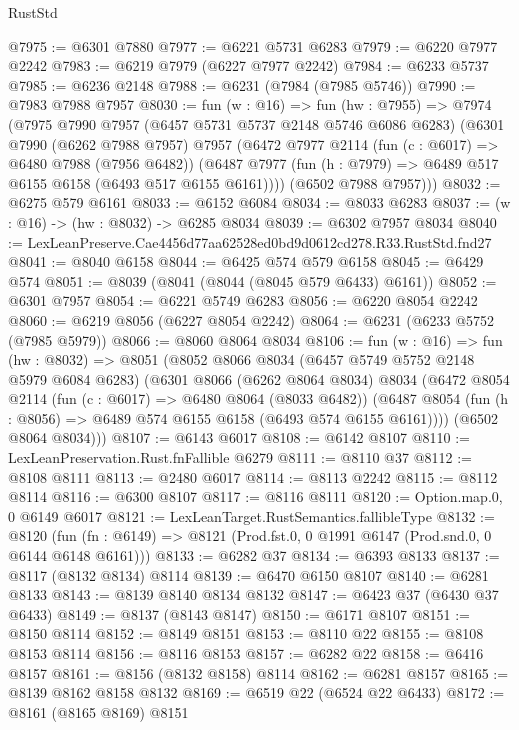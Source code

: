 \begin{lexlean}{RustStd}
\begin{coremodule}
@7975 := @6301 @7880
@7977 := @6221 @5731 @6283
@7979 := @6220 @7977 @2242
@7983 := @6219 @7979 (@6227 @7977 @2242)
@7984 := @6233 @5737
@7985 := @6236 @2148
@7988 := @6231 (@7984 (@7985 @5746))
@7990 := @7983 @7988 @7957
@8030 := fun (w : @16) =>
  fun (hw : @7955) =>
  @7974
    (@7975
      @7990
      @7957
      (@6457 @5731 @5737 @2148 @5746 @6086 @6283)
      (@6301
        @7990
        (@6262 @7988 @7957)
        @7957
        (@6472
          @7977
          @2114
          (fun (c : @6017) => @6480 @7988 (@7956 @6482))
          (@6487 @7977 (fun (h : @7979) => @6489 @517 @6155 @6158 (@6493 @517 @6155 @6161))))
        (@6502 @7988 @7957)))
@8032 := @6275 @579 @6161
@8033 := @6152 @6084
@8034 := @8033 @6283
@8037 := (w : @16) -> (hw : @8032) -> @6285 @8034
@8039 := @6302 @7957 @8034
@8040 := LexLeanPreserve.Cae4456d77aa62528ed0bd9d0612cd278.R33.RustStd.fnd27
@8041 := @8040 @6158
@8044 := @6425 @574 @579 @6158
@8045 := @6429 @574
@8051 := @8039 (@8041 (@8044 (@8045 @579 @6433) @6161))
@8052 := @6301 @7957
@8054 := @6221 @5749 @6283
@8056 := @6220 @8054 @2242
@8060 := @6219 @8056 (@6227 @8054 @2242)
@8064 := @6231 (@6233 @5752 (@7985 @5979))
@8066 := @8060 @8064 @8034
@8106 := fun (w : @16) =>
  fun (hw : @8032) =>
  @8051
    (@8052
      @8066
      @8034
      (@6457 @5749 @5752 @2148 @5979 @6084 @6283)
      (@6301
        @8066
        (@6262 @8064 @8034)
        @8034
        (@6472
          @8054
          @2114
          (fun (c : @6017) => @6480 @8064 (@8033 @6482))
          (@6487 @8054 (fun (h : @8056) => @6489 @574 @6155 @6158 (@6493 @574 @6155 @6161))))
        (@6502 @8064 @8034)))
@8107 := @6143 @6017
@8108 := @6142 @8107
@8110 := LexLeanPreservation.Rust.fnFallible @6279
@8111 := @8110 @37
@8112 := @8108 @8111
@8113 := @2480 @6017
@8114 := @8113 @2242
@8115 := @8112 @8114
@8116 := @6300 @8107
@8117 := @8116 @8111
@8120 := Option.map.{0, 0} @6149 @6017
@8121 := LexLeanTarget.RustSemantics.fallibleType
@8132 := @8120
    (fun (fn : @6149) => @8121 (Prod.fst.{0, 0} @1991 @6147 (Prod.snd.{0, 0} @6144 @6148 @6161)))
@8133 := @6282 @37
@8134 := @6393 @8133
@8137 := @8117 (@8132 @8134) @8114
@8139 := @6470 @6150 @8107
@8140 := @6281 @8133
@8143 := @8139 @8140 @8134 @8132
@8147 := @6423 @37 (@6430 @37 @6433)
@8149 := @8137 (@8143 @8147)
@8150 := @6171 @8107
@8151 := @8150 @8114
@8152 := @8149 @8151
@8153 := @8110 @22
@8155 := @8108 @8153 @8114
@8156 := @8116 @8153
@8157 := @6282 @22
@8158 := @6416 @8157
@8161 := @8156 (@8132 @8158) @8114
@8162 := @6281 @8157
@8165 := @8139 @8162 @8158 @8132
@8169 := @6519 @22 (@6524 @22 @6433)
@8172 := @8161 (@8165 @8169) @8151

\end{coremodule}
\end{lexlean}
